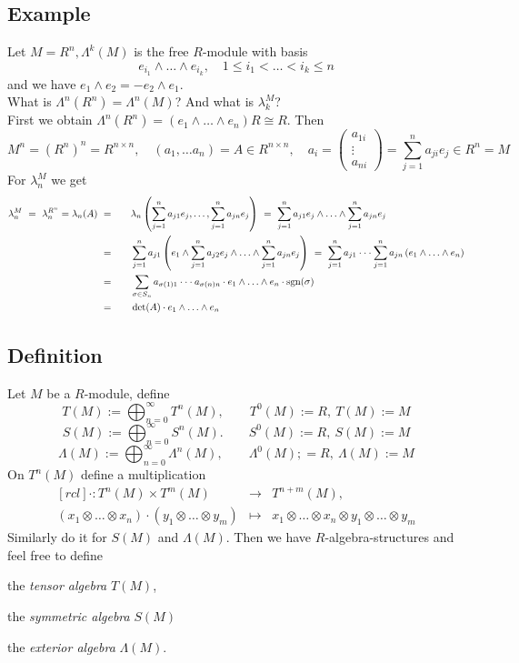 \documentclass[12pt]{book}
\begin{document}
\begin{spacing}{1.3}
\subsection{Example} %
Let $M=R^n, \Lambda^k(M)$ is the free $R$-module with basis 
$$e_{i_1} \wedge \ldots \wedge e_{i_k}, \quad 1 \leqslant i_1 < \ldots < i_k \leqslant n$$
and we have $e_1 \wedge e_2=-e_2 \wedge e_1$. \\
What is $\Lambda^n(R^n)=\Lambda^n(M)$? And what is $\lambda_k^M$?\\
First we obtain $\Lambda^n(R^n)=(e_1 \wedge \ldots \wedge e_n)R \cong R$. Then 
$$M^n=(R^n)^n=R^{n \times n}, \quad (a_1, \ldots a_n)=A \in R^{n \times n}, \quad a_i = \begin{pmatrix} a_{1i} \\ \vdots \\ a_{ni} \end{pmatrix}=\sum_{j=1}^n a_{ji}e_j \in R^n=M$$
For $\lambda_n^M$ we get
\begin{alignat*}{8}
\lambda_n^M\ =\ \lambda_n^{R^n}=\lambda_n(A)\ &=&&\quad \lambda_n \left( \sum_{j=1}^n a_{j1}e_j, \ldots, \sum_{j=1}^n a_{jn}e_j \right)\ =\ \sum_{j=1}^n a_{j1} e_j \wedge \ldots \wedge \sum_{j=1}^n a_{jn}e_j \\
&=&&\quad \sum_{j=1}^n a_{j1} \left( e_1 \wedge \sum_{j=1}^n a_{j2}e_j \wedge \ldots \wedge \sum_{j=1}^n a_{jn}e_j \right)\ =\ \sum_{j=1}^n a_{j1} \cdot \cdot \cdot \sum_{j=1}^n a_{jn} \left(e_1 \wedge \ldots \wedge e_n \right)\\
&=&&\quad \sum_{\sigma \in S_n} a_{\sigma(1)1} \cdot \cdot \cdot a_{\sigma(n)n} \cdot e_1 \wedge \ldots \wedge e_n \cdot \rm{sgn}(\sigma)\\
&=&&\quad \det(A) \cdot e_1 \wedge \ldots \wedge e_n
\end{alignat*}

\subsection{Definition} %
Let $M$ be a $R$-module, define
$$T(M):= \bigoplus_{n=0}^{\infty} T^n(M), \qquad T^0(M):=R, \ T(M):=M$$
$$S(M):= \bigoplus_{n=0}^{\infty} S^n(M). \qquad S^0(M):=R, \ S(M):=M$$
$$\Lambda(M):= \bigoplus_{n=0}^{\infty} \Lambda^n(M), \qquad \Lambda^0(M);=R, \ \Lambda(M):=M$$
On $T^n(M)$ define a multiplication
$$\begin{matrix}[rcl]\cdot: T^n(M) \times T^m(M) &\longrightarrow &T^{n+m}(M), \\ (x_1 \otimes \ldots \otimes x_n) \cdot (y_1 \otimes \ldots\otimes y_m) & \mapsto & x_1 \otimes \ldots \otimes x_n \otimes y_1 \otimes \ldots \otimes y_m\end{matrix}$$
Similarly do it for $S(M)$ and $\Lambda(M)$. Then we have $R$-algebra-structures and feel free to define
\begin{compactenum}
\item the \textit{tensor algebra} $T(M)$,
\item the \textit{symmetric algebra} $S(M)$
\item the \textit{exterior algebra} $\Lambda(M)$.
\end{compactenum}


\end{spacing}
\end{document}
